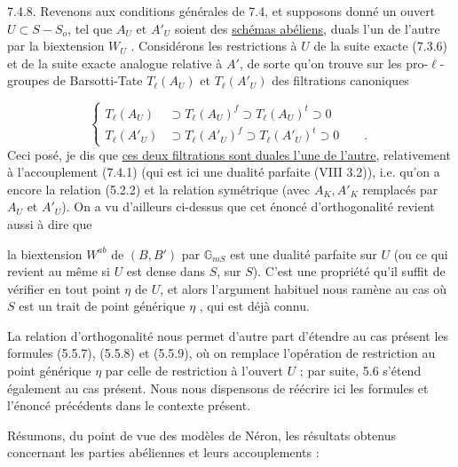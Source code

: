 7.4.8. Revenons aux conditions générales de 7.4, et supposons donné un ouvert $U \subset S-S_o$, tel que $A_U$ et $A'_U$ soient des \underline{schémas abéliens}, duals l'un de l'autre par la biextension $W_U$ . Considérons les restrictions à $U$ de la suite exacte (7.3.6) et de la suite exacte analogue relative à $A'$, de sorte qu'on trouve sur les pro-$\ell$-groupes de Barsotti-Tate $T_\ell(A_U)$ et $T_\ell(A'_U)$ des filtrations canoniques

\begin{equation}\tag{7.4.9}
\left\{\begin{aligned} T_\ell(A_U) &\supset T_\ell(A_U)^f \supset T_\ell(A_U)^t \supset 0 \\[4ex] T_\ell(A'_U) &\supset T_\ell(A'_U)^f \supset T_\ell(A'_U)^t \supset 0 \qquad . \end{aligned}\right.
\end{equation}
Ceci posé, je dis que \underline{ces deux filtrations sont duales l'une de l'autre}, relativement à l'accouplement (7.4.1) (qui est ici une dualité parfaite (VIII 3.2)), i.e. qu'on a encore la relation (5.2.2) et la relation symétrique (avec $A_K,A'_K$ remplacés par $A_U$ et $A'_U$). On a vu d'ailleurs ci-dessus que cet énoncé d'orthogonalité revient aussi à dire que



la biextension $W^{ab}$ de $(B,B')$ par $\mathbb{G}_{mS}$ est une dualité parfaite sur $U$ (ou ce qui revient au même si $U$ est dense dans $S$, sur $S$). C'est une propriété qu'il suffit de vérifier en tout point $\eta$ de $U$, et alors l'argument habituel nous ramène au cas où $S$ est un trait de point générique $\eta$ , qui est déjà connu.

La relation d'orthogonalité nous permet d'autre part d'étendre au cas présent les formules (5.5.7), (5.5.8) et (5.5.9), où on remplace l'opération de restriction au point générique $\eta$ par celle de restriction à l'ouvert $U$ ; par suite, 5.6 s'étend également au cas présent. Nous nous dispensons de réécrire ici les formules et l'énoncé précédents dans le contexte présent.

Résumons, du point de vue des modèles de Néron, les résultats obtenus concernant les parties abéliennes et leurs accouplements :

